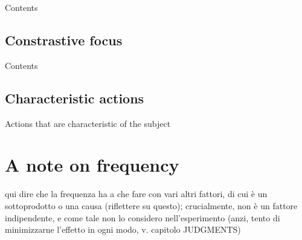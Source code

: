 Contents

\subsection{Constrastive focus} 

Contents

\subsection{Characteristic actions} 

Actions that are characteristic of the subject


\section{A note on frequency}

qui dire che la frequenza ha a che fare con vari altri fattori, di cui è un sottoprodotto o una causa (riflettere su questo); crucialmente, non è un fattore indipendente, e come tale non lo considero nell'esperimento (anzi, tento di minimizzarne l'effetto in ogni modo, v. capitolo JUDGMENTS)






